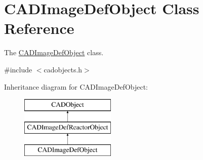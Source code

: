\hypertarget{class_c_a_d_image_def_object}{}\section{C\+A\+D\+Image\+Def\+Object Class Reference}
\label{class_c_a_d_image_def_object}


The \hyperlink{class_c_a_d_image_def_object}{C\+A\+D\+Image\+Def\+Object} class.  




{\ttfamily \#include $<$cadobjects.\+h$>$}

Inheritance diagram for C\+A\+D\+Image\+Def\+Object\+:\begin{figure}[H]
\begin{center}
\leavevmode
\includegraphics[height=3.000000cm]{class_c_a_d_image_def_object}
\end{center}
\end{figure}
